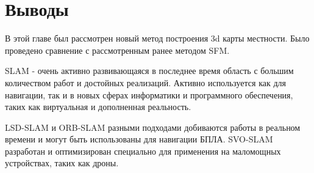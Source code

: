 \section{Выводы}

В этой главе был рассмотрен новый метод построения 3d карты местности. Было проведено сравнение с рассмотренным ранее методом SFM.

SLAM - очень активно развивающаяся в последнее время область с большим количеством работ и достойных реализаций. Активно используется как для навигации, так и в новых сферах информатики и программного обеспечения, таких как виртуальная и дополненная реальность.

LSD-SLAM и ORB-SLAM разными подходами добиваются работы в реальном времени и могут быть использованы для навигации БПЛА. SVO-SLAM разработан и оптимизирован специально для применения на маломощных устройствах, таких как дроны.
